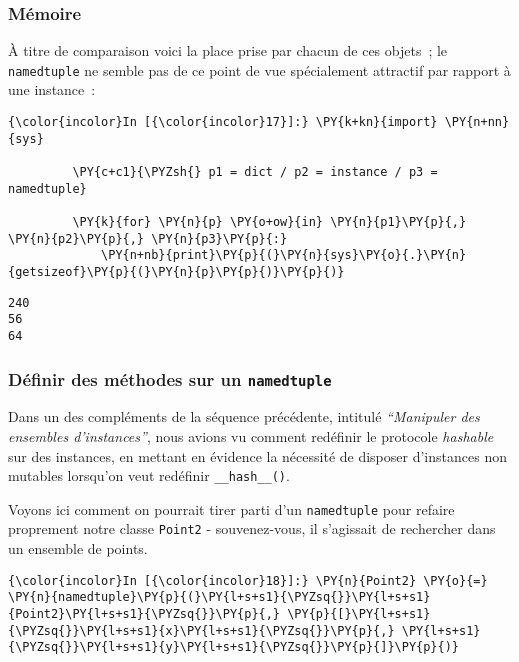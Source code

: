     \hypertarget{muxe9moire}{%
\subsubsection{Mémoire}\label{muxe9moire}}

    À titre de comparaison voici la place prise par chacun de ces objets~;
le \texttt{namedtuple} ne semble pas de ce point de vue spécialement
attractif par rapport à une instance~:

    \begin{Verbatim}[commandchars=\\\{\},frame=single,framerule=0.3mm,rulecolor=\color{cellframecolor}]
{\color{incolor}In [{\color{incolor}17}]:} \PY{k+kn}{import} \PY{n+nn}{sys}
         
         \PY{c+c1}{\PYZsh{} p1 = dict / p2 = instance / p3 = namedtuple}
         
         \PY{k}{for} \PY{n}{p} \PY{o+ow}{in} \PY{n}{p1}\PY{p}{,} \PY{n}{p2}\PY{p}{,} \PY{n}{p3}\PY{p}{:}
             \PY{n+nb}{print}\PY{p}{(}\PY{n}{sys}\PY{o}{.}\PY{n}{getsizeof}\PY{p}{(}\PY{n}{p}\PY{p}{)}\PY{p}{)}
\end{Verbatim}


    \begin{Verbatim}[commandchars=\\\{\},frame=single,framerule=0.3mm,rulecolor=\color{cellframecolor}]
240
56
64
\end{Verbatim}

    \hypertarget{duxe9finir-des-muxe9thodes-sur-un-namedtuple}{%
\subsubsection{\texorpdfstring{Définir des méthodes sur un
\texttt{namedtuple}}{Définir des méthodes sur un namedtuple}}\label{duxe9finir-des-muxe9thodes-sur-un-namedtuple}}

    Dans un des compléments de la séquence précédente, intitulé
\emph{``Manipuler des ensembles d'instances''}, nous avions vu comment
redéfinir le protocole \emph{hashable} sur des instances, en mettant en
évidence la nécessité de disposer d'instances non mutables lorsqu'on
veut redéfinir \texttt{\_\_hash\_\_()}.

Voyons ici comment on pourrait tirer parti d'un \texttt{namedtuple} pour
refaire proprement notre classe \texttt{Point2} - souvenez-vous, il
s'agissait de rechercher dans un ensemble de points.

    \begin{Verbatim}[commandchars=\\\{\},frame=single,framerule=0.3mm,rulecolor=\color{cellframecolor}]
{\color{incolor}In [{\color{incolor}18}]:} \PY{n}{Point2} \PY{o}{=} \PY{n}{namedtuple}\PY{p}{(}\PY{l+s+s1}{\PYZsq{}}\PY{l+s+s1}{Point2}\PY{l+s+s1}{\PYZsq{}}\PY{p}{,} \PY{p}{[}\PY{l+s+s1}{\PYZsq{}}\PY{l+s+s1}{x}\PY{l+s+s1}{\PYZsq{}}\PY{p}{,} \PY{l+s+s1}{\PYZsq{}}\PY{l+s+s1}{y}\PY{l+s+s1}{\PYZsq{}}\PY{p}{]}\PY{p}{)}
\end{Verbatim}


